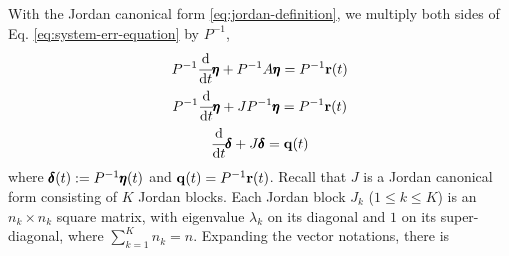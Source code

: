 With the Jordan canonical form \eqref{eq:jordan-definition}, we multiply both sides of Eq. \eqref{eq:system-err-equation} by $P^{-1}$,
\begin{gather}
    P^{-1}\cfrac{\mathrm{d} }{\mathrm{d} t}\pmb{\eta} + P^{-1}A \pmb{\eta} = P^{-1}\mathbf{r}(t) \\
    P^{-1}\cfrac{\mathrm{d} }{\mathrm{d} t}\pmb{\eta} + JP^{-1} \pmb{\eta} = P^{-1}\mathbf{r}(t) \\
    \cfrac{\mathrm{d} }{\mathrm{d} t}\pmb{\delta} + J \pmb{\delta}  = \mathbf{q}(t) 
\end{gather}
where $\pmb{\delta}(t) := P^{-1}\pmb{\eta}(t)$ and $\mathbf{q}(t) = P^{-1}\mathbf{r}(t)$. Recall that $J$ is a Jordan canonical form consisting of $K$ Jordan blocks. Each Jordan block $J_k$ ($1\leq k \leq K$) is an $n_k \times n_k$ square matrix, with eigenvalue $\lambda_k$ on its diagonal and $1$ on its super-diagonal, where $\sum_{k=1}^{K} n_k = n$. Expanding the vector notations, there is 
\begingroup
    \newcommand{\?}[1]{\multicolumn{1}{c|}{#1}}
